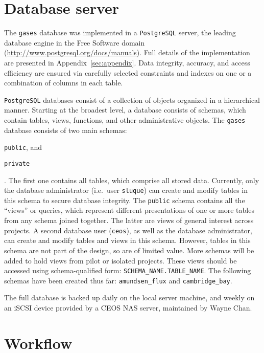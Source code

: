 \documentclass[12pt,letterpaper,titlepage,headings=small,numbers=noenddot]%
{scrartcl}
\begin{document}
\clearpage{}
\section{Database server}
\label{sec:database-server}

The \texttt{gases} database was implemented in a \texttt{PostgreSQL}
server, the leading database engine in the Free Software domain
(\url{http://www.postgresql.org/docs/manuals}).  Full details of the
implementation are presented in Appendix~\ref{sec:appendix}.  Data
integrity, accuracy, and access efficiency are ensured via carefully
selected constraints and indexes on one or a combination of columns in each
table.

\texttt{PostgreSQL} databases consist of a collection of objects organized
in a hierarchical manner.  Starting at the broadest level, a database
consists of schemas, which contain tables, views, functions, and other
administrative objects.  The \texttt{gases} database consists of two
main schemas:
\begin{inparaenum}[a)]
\item \texttt{public}, and
\item \texttt{private}
\end{inparaenum}.  The first one contains all tables, which comprise all
stored data.  Currently, only the database administrator (i.e.~user
\texttt{sluque}) can create and modify tables in this schema to secure
database integrity.  The \texttt{public} schema contains all the ``views''
or queries, which represent different presentations of one or more tables
from any schema joined together.  The latter are views of general interest
across projects.  A second database user (\texttt{ceos}), as well as the
database administrator, can create and modify tables and views in this
schema.  However, tables in this schema are not part of the design, so are
of limited value.  More schemas will be added to hold views from pilot or
isolated projects.  These views should be accessed using schema-qualified
form: \texttt{SCHEMA\_NAME.TABLE\_NAME}.  The following schemas have been
created thus far: \texttt{amundsen\_flux} and \texttt{cambridge\_bay}.

The full database is backed up daily on the local server machine, and
weekly on an iSCSI device provided by a CEOS NAS server, maintained by
Wayne Chan.


\section{Workflow}
\label{sec:workflow}
\end{document}
